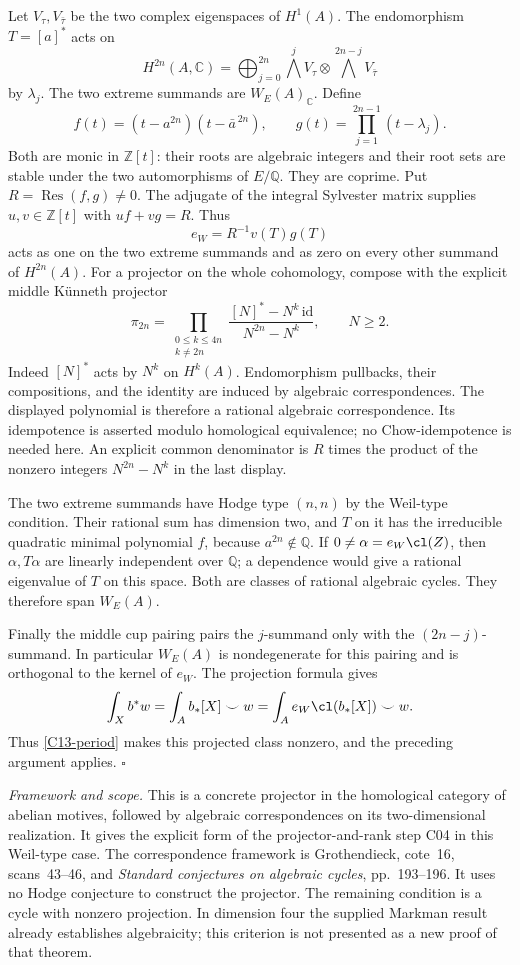 \documentclass[11pt]{article}
\newcommand{\Q}{\mathbb Q}\newcommand{\C}{\mathbb C}\newcommand{\Z}{\mathbb Z}\newcommand{\R}{\mathbb R}\newcommand{\A}{\mathbb A}\newcommand{\OO}{\mathcal O}
\newcommand{\framework}[1]{\par\smallskip\noindent\textit{Framework and scope.} #1\par}
\theoremstyle{definition}\newtheorem{definition}[theorem]{Definition}\newtheorem{remark}[theorem]{Remark}
\begin{document}
Let $V_\tau,V_{\bar\tau}$ be the two complex eigenspaces of $H^1(A)$.
The endomorphism $T=[a]^*$ acts on
\[
 H^{2n}(A,\C)=\bigoplus_{j=0}^{2n}
       \bigwedge^jV_\tau\otimes\bigwedge^{2n-j}V_{\bar\tau}
\]
by $\lambda_j$. The two extreme summands are
$W_E(A)_\C$. Define
\[
 f(t)=(t-a^{2n})(t-\bar a^{\,2n}),\qquad
 g(t)=\prod_{j=1}^{2n-1}(t-\lambda_j).
\]
Both are monic in $\Z[t]$: their roots are algebraic integers and
their root sets are stable under the two automorphisms of $E/\Q$.
They are coprime. Put $R=\operatorname{Res}(f,g)\ne0$.
The adjugate of the integral Sylvester matrix supplies
$u,v\in\Z[t]$ with $uf+vg=R$. Thus
\[
 e_W=R^{-1}v(T)g(T)
\]
acts as one on the two extreme summands and as zero on every other
summand of $H^{2n}(A)$. For a projector on the whole cohomology, compose
with the explicit middle K\"unneth projector
\[
 \pi_{2n}=
 \prod_{\substack{0\le k\le4n\\k\ne2n}}
   \frac{[N]^*-N^k\,\mathrm{id}}{N^{2n}-N^k},\qquad N\ge2.
\]
Indeed $[N]^*$ acts by $N^k$ on $H^k(A)$. Endomorphism pullbacks,
their compositions, and the identity are induced by algebraic
correspondences. The displayed polynomial is therefore a rational
algebraic correspondence. Its idempotence is asserted modulo
homological equivalence; no Chow-idempotence is needed here.
An explicit common denominator is $R$ times the product of the
nonzero integers $N^{2n}-N^k$ in the last display.

The two extreme summands have Hodge type $(n,n)$ by the Weil-type
condition. Their rational sum has dimension two, and $T$ on it has
the irreducible quadratic minimal polynomial $f$, because
$a^{2n}\notin\Q$. If $0\ne\alpha=e_W\cl(Z)$, then
$\alpha,T\alpha$ are linearly independent over $\Q$; a dependence
would give a rational eigenvalue of $T$ on this space. Both are
classes of rational algebraic cycles. They therefore span $W_E(A)$.

Finally the middle cup pairing pairs the $j$-summand only with the
$(2n-j)$-summand. In particular $W_E(A)$ is nondegenerate for this
pairing and is orthogonal to the kernel of $e_W$. The projection
formula gives
\[
 \int_X b^*w=\int_A b_*[X]\smile w
           =\int_A e_W\cl(b_*[X])\smile w.
\]
Thus \eqref{C13-period} makes this projected class nonzero, and the
preceding argument applies. $\square$

\framework{This is a concrete projector in the homological category
of abelian motives, followed by algebraic correspondences on its
two-dimensional realization. It gives the explicit form of the
projector-and-rank step C04 in this Weil-type case. The correspondence
framework is Grothendieck, cote~16, scans~43--46, and
\emph{Standard conjectures on algebraic cycles}, pp.~193--196.
It uses no Hodge conjecture to construct the projector. The remaining
condition is a cycle with nonzero projection. In dimension four the
supplied Markman result already establishes algebraicity; this
criterion is not presented as a new proof of that theorem.}
\end{document}
